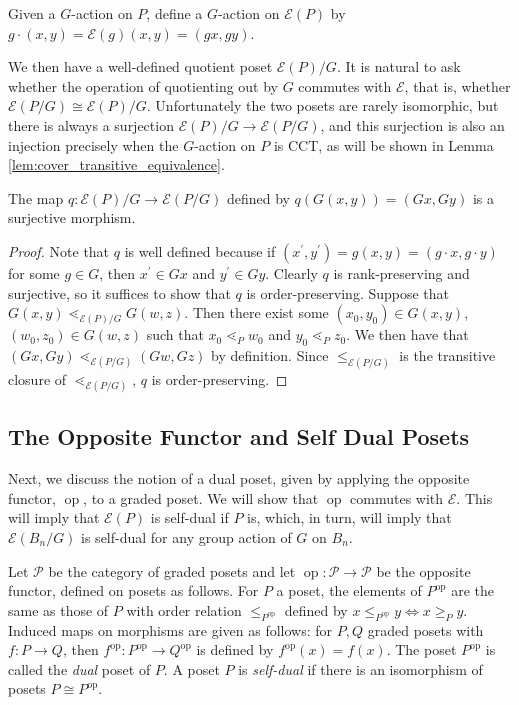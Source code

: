 \documentclass[smallextended, envcountsame, numbook]{svjour3}
\numberwithin{equation}{section}
\newcommand\ssec{\subsection}
\renewcommand{\iff}{\Leftrightarrow}
\newcommand\op{\operatorname{op}}
\begin{document}
\begin{definition}\label{note:G_action_on_FP}
Given a $G$-action on $P$, define a $G$-action on $\mathcal E(P)$ by $g\cdot (x,y) = \mathcal{E}(g)(x,y) = (gx,gy)$.
\end{definition}

We then have a well-defined quotient poset $\mathcal E(P)/G$.  It is natural to ask whether the operation of quotienting out by $G$ commutes with $\mathcal E$, that is, whether $\mathcal E(P/G) \cong \mathcal E(P)/G$.  Unfortunately the two posets are rarely isomorphic, but there is always a surjection $\mathcal E(P)/G\rightarrow \mathcal E(P/G)$, and this surjection is also an injection precisely when the $G$-action on $P$ is CCT, as will be shown in Lemma \ref{lem:cover_transitive_equivalence}.


\begin{proposition}\label{prop:surjection_between_F_quotients}
The map $q\colon \mathcal E(P)/G\rightarrow \mathcal E(P/G)$ defined by $q(G(x, y)) = (Gx,Gy)$ is a surjective morphism.
\end{proposition}

\begin{proof}

Note that $q$ is well defined because if $(x^\prime, y^\prime) = g(x, y) = (g\cdot x, g\cdot y)$ for some $g\in G$, then $x^\prime\in Gx$ and $y^\prime\in Gy$.  Clearly $q$ is rank-preserving and surjective, so it suffices to show that $q$ is order-preserving.  Suppose that $G(x, y) \lessdot_{\mathcal E(P)/G} G(w, z)$.  Then there exist some $(x_0, y_0)\in G(x, y)$, $(w_0, z_0)\in G(w, z)$ such that $x_0\lessdot_P w_0$ and $y_0\lessdot_P z_0$.  We then have that $(Gx, Gy) \lessdot_{\mathcal E(P/G)} (Gw, Gz)$ by definition. Since $\le_{\mathcal E(P/G)}$ is the transitive closure of $\lessdot_{\mathcal E(P/G)}$, $q$ is order-preserving.
\end{proof}

\ssec{The Opposite Functor and Self Dual Posets}
\label{ssec:dual_posets}

Next, we discuss the notion of a dual poset, given by applying the opposite functor, $\op$, to a graded poset. We will show that $\op$ commutes with $\mathcal E$. This will imply that $\mathcal E(P)$ is self-dual if $P$ is, which, in turn, will imply that $\mathcal E(B_n/G)$ is self-dual for any group action of $G$ on $B_n$.

\begin{definition}
Let $\mathcal P$ be the category of graded posets and let $\op\colon\mathcal P \rightarrow \mathcal P$ be the opposite functor, defined on posets as follows. For $P$ a poset, the elements of $P^{\op}$ are the same as those of $P$ with order relation $\le_{P^{\op}}$ defined by $x \leq_{P^{\op}} y \iff x \geq_P y$. Induced maps on morphisms are given as follows: for $P,Q$ graded posets with $f\colon P \rightarrow Q$, then $f^{\op}\colon P^{\op} \rightarrow Q^{\op}$ is defined by $f^{\op}(x) = f(x)$. The poset $P^{\op}$ is called the {\it dual} poset of $P$. A poset $P$ is {\it self-dual} if there is an isomorphism of posets $P \cong P^{\op}$.
\end{definition}
\end{document}
